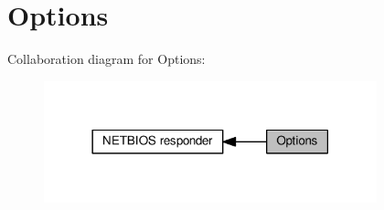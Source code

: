 \hypertarget{group__netbiosns__opts}{}\section{Options}
\label{group__netbiosns__opts}
Collaboration diagram for Options\+:
\nopagebreak
\begin{figure}[H]
\begin{center}
\leavevmode
\includegraphics[width=273pt]{group__netbiosns__opts}
\end{center}
\end{figure}
